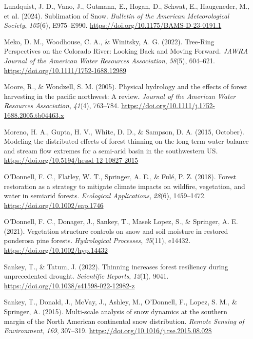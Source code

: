 \documentclass[
]{agujournal2019}
\newlength{\cslhangindent}
\newenvironment{CSLReferences}[2] %
 {\begin{list}{}{%
  \setlength{\itemindent}{0pt}
  \setlength{\leftmargin}{0pt}
  \setlength{\parsep}{0pt}
  \ifodd #1
   \setlength{\leftmargin}{\cslhangindent}
   \setlength{\itemindent}{-1\cslhangindent}
  \fi
  \setlength{\itemsep}{#2\baselineskip}}}
 {\end{list}}
\begin{document}
\begin{CSLReferences}{1}{0}
Lundquist, J. D., Vano, J., Gutmann, E., Hogan, D., Schwat, E.,
Haugeneder, M., et al. (2024). Sublimation of {Snow}. \emph{Bulletin of
the American Meteorological Society}, \emph{105}(6), E975--E990.
\url{https://doi.org/10.1175/BAMS-D-23-0191.1}

Meko, D. M., Woodhouse, C. A., \& Winitsky, A. G. (2022). Tree‐{Ring}
{Perspectives} on the {Colorado} {River}: {Looking} {Back} and {Moving}
{Forward}. \emph{JAWRA Journal of the American Water Resources
Association}, \emph{58}(5), 604--621.
\url{https://doi.org/10.1111/1752-1688.12989}

Moore, R., \& Wondzell, S. M. (2005). Physical hydrology and the effects
of forest harvesting in the pacific northwest: {A} review. \emph{Journal
of the American Water Resources Association}, \emph{41}(4), 763--784.
\url{https://doi.org/10.1111/j.1752-1688.2005.tb04463.x}

Moreno, H. A., Gupta, H. V., White, D. D., \& Sampson, D. A. (2015,
October). Modeling the distributed effects of forest thinning on the
long-term water balance and stream flow extremes for a semi-arid basin
in the southwestern {US}.
\url{https://doi.org/10.5194/hessd-12-10827-2015}

O'Donnell, F. C., Flatley, W. T., Springer, A. E., \& Fulé, P. Z.
(2018). Forest restoration as a strategy to mitigate climate impacts on
wildfire, vegetation, and water in semiarid forests. \emph{Ecological
Applications}, \emph{28}(6), 1459--1472.
\url{https://doi.org/10.1002/eap.1746}

O'Donnell, F. C., Donager, J., Sankey, T., Masek Lopez, S., \& Springer,
A. E. (2021). Vegetation structure controls on snow and soil moisture in
restored ponderosa pine forests. \emph{Hydrological Processes},
\emph{35}(11), e14432. \url{https://doi.org/10.1002/hyp.14432}

Sankey, T., \& Tatum, J. (2022). Thinning increases forest resiliency
during unprecedented drought. \emph{Scientific Reports}, \emph{12}(1),
9041. \url{https://doi.org/10.1038/s41598-022-12982-z}

Sankey, T., Donald, J., McVay, J., Ashley, M., O'Donnell, F., Lopez, S.
M., \& Springer, A. (2015). Multi-scale analysis of snow dynamics at the
southern margin of the {North} {American} continental snow distribution.
\emph{Remote Sensing of Environment}, \emph{169}, 307--319.
\url{https://doi.org/10.1016/j.rse.2015.08.028}


\end{CSLReferences}
\end{document}
